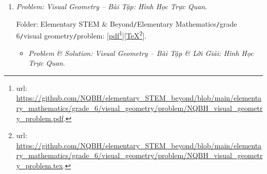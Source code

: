 \documentclass[12pt]{article}
\begin{document}
\begin{enumerate}
	Folder: {\sf Elementary STEM \& Beyond{\tt/}Elementary Mathematics{\tt/}grade 6{\tt/}integer{\tt/}problem}: [\href{https://github.com/NQBH/elementary_STEM_beyond/blob/main/elementary_mathematics/grade_6/integer/problem/NQBH_integer_problem.pdf}{pdf}\footnote{{\sc url}: \url{https://github.com/NQBH/elementary_STEM_beyond/blob/main/elementary_mathematics/grade_6/integer/problem/NQBH_integer_problem.pdf}.}][\href{https://github.com/NQBH/elementary_STEM_beyond/blob/main/elementary_mathematics/grade_6/integer/problem/NQBH_integer_problem.tex}{\TeX}\footnote{{\sc url}: \url{https://github.com/NQBH/elementary_STEM_beyond/blob/main/elementary_mathematics/grade_6/integer/problem/NQBH_integer_problem.tex}.}].
	\begin{itemize}
		\item {\it Problem \& Solution: Integers $\mathbb{Z}$ -- Bài Tập \& Lời Giải: Số Nguyên $\mathbb{Z}$}.
		
		Folder: {\sf Elementary STEM \& Beyond{\tt/}Elementary Mathematics{\tt/}grade 6{\tt/}integer{\tt/}solution}: [\href{https://github.com/NQBH/elementary_STEM_beyond/blob/main/elementary_mathematics/grade_6/integer/problem/NQBH_integer_solution.pdf}{pdf}\footnote{{\sc url}: \url{https://github.com/NQBH/elementary_STEM_beyond/blob/main/elementary_mathematics/grade_6/integer/problem/NQBH_integer_solution.pdf}.}][\href{https://github.com/NQBH/elementary_STEM_beyond/blob/main/elementary_mathematics/grade_6/integer/problem/NQBH_integer_solution.tex}{\TeX}\footnote{{\sc url}: \url{https://github.com/NQBH/elementary_STEM_beyond/blob/main/elementary_mathematics/grade_6/integer/problem/NQBH_integer_solution.tex}.}].
	\end{itemize}
	\item {\it Problem: Visual Geometry -- Bài Tập: Hình Học Trực Quan}.
	
	Folder: {\sf Elementary STEM \& Beyond{\tt/}Elementary Mathematics{\tt/}grade 6{\tt/}visual geometry{\tt/}problem}: [\href{https://github.com/NQBH/elementary_STEM_beyond/blob/main/elementary_mathematics/grade_6/visual_geometry/problem/NQBH_visual_geometry_problem.pdf}{pdf}\footnote{{\sc url}: \url{https://github.com/NQBH/elementary_STEM_beyond/blob/main/elementary_mathematics/grade_6/visual_geometry/problem/NQBH_visual_geometry_problem.pdf}.}][\href{https://github.com/NQBH/elementary_STEM_beyond/blob/main/elementary_mathematics/grade_6/visual_geometry/problem/NQBH_visual_geometry_problem.tex}{\TeX}\footnote{{\sc url}: \url{https://github.com/NQBH/elementary_STEM_beyond/blob/main/elementary_mathematics/grade_6/visual_geometry/problem/NQBH_visual_geometry_problem.tex}.}].
	\begin{itemize}
		\item {\it Problem \& Solution: Visual Geometry -- Bài Tập \& Lời Giải: Hình Học Trực Quan}.
		

\end{itemize}
\end{enumerate}
\end{document}
